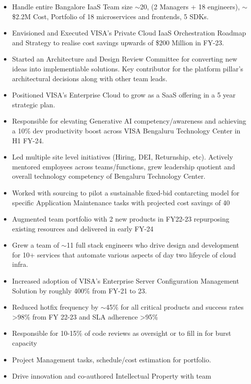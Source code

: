 \documentclass[10pt,a4paper,ragged2e,withhyper]{altacv}
\begin{document}
\begin{paracol}{2}


\begin{itemize}
  \item Handle entire Bangalore IaaS Team size \(\sim \)20, (2 Managers + 18 engineers), \(\sim\)\$2.2M Cost, Portfolio of 18 microservices and frontends, 5 SDKs.
  \item Envisioned and Executed VISA's Private Cloud IaaS Orchestration Roadmap and Strategy to realise cost savings upwards of \$200 Million in FY-23.
  \item Started an Architecture and Design Review Committee for converting new ideas into implementiable solutions. Key contributor for the platform pillar's architectural decisions along with other team leads.
  \item Positioned VISA's Enterprise Cloud to grow as a SaaS offering in a 5 year strategic plan.
  \item Responsible for elevating Generative AI competency/awareness and achieving a 10\% dev productivity boost across VISA Bengaluru Technology Center in H1 FY-24.
  \item Led multiple site level initiatives (Hiring, DEI, Returnship, etc). Actively mentored employees across teams/functions, grew leadership quotient and overall technology competency of Bengaluru Technology Center.
  \item Worked with sourcing to pilot a sustainable fixed-bid contarcting model for specific Application Maintenance tasks with projected cost savings of 40%
\end{itemize}

\divider

\begin{itemize}
  \item Augmented team portfolio with 2 new products in FY22-23 repurposing existing resources and delivered in early FY-24
  \item Grew a team of \(\sim \)11 full stack engineers who drive design and development for 10+ services that automate various aspects of day two lifeycle of cloud infra.
  \item Increased adoption of VISA's Enterprise Server Configuration Management Solution by roughly 400\% from FY-21 to 23.
  \item Reduced hotfix frequency by \(\sim \)45\% for all critical products and success rates >98\% from FY 22-23 and SLA adherence >95\%
  \item Responsible for 10-15\% of code reviews as oversight or to fill in for burst capacity 
  \item Project Management tasks, schedule/cost estimation for portfolio.
  \item Drive innovation and co-authored Intellectual Property with team
\end{itemize}


\end{paracol}
\end{document}
